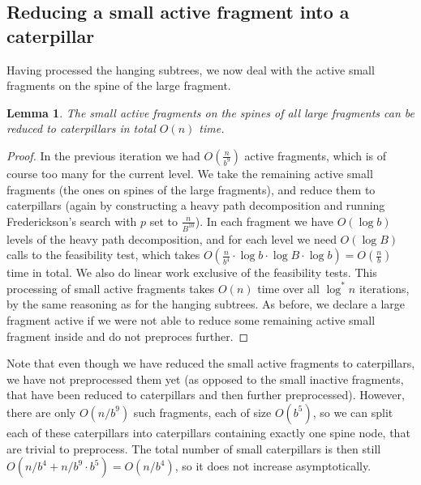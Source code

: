 \documentclass[11pt,a4paper]{article}
\newtheorem{lemma}{Lemma}
\theoremstyle{definition}
\theoremstyle{remark}
\begin{document}
\subsection{Reducing a small active fragment into a caterpillar}\label{section:lemma2}
Having processed the hanging subtrees, we now deal with the active small fragments on the spine of the large fragment. 

\begin{lemma}\label{lemma2}
	The small active fragments on the spines of all large fragments can be reduced to caterpillars in total $O(n)$ time. 
\end{lemma}
\begin{proof}

In the previous iteration we had $O(\frac{n}{b^9})$ active fragments, which is of course
too many for the current level. We take the remaining active small fragments (the ones on spines of the large 
fragments), and reduce them to caterpillars (again by constructing a heavy path decomposition and running
Frederickson's search with $p$ set to $\frac{n}{B^{10}}$). In each fragment we have $O(\log b)$ levels of the heavy
path decomposition, and for each level we need $O(\log B)$ calls to the feasibility test, which takes
$O(\frac{n}{b^4} \cdot \log b \cdot \log B \cdot \log b) = O(\frac{n}{b})$ time in total. We also do linear
work exclusive of the feasibility tests. This processing of small active fragments takes $O(n)$ time over all
$\log ^*n$ iterations, by the same reasoning as for the hanging subtrees.
As before, we declare a large fragment active if we were not able to reduce some remaining active small
fragment inside and do not preproces further.
\end{proof}

Note that even though we have reduced the small active fragments to caterpillars, we have not preprocessed them yet
(as opposed to the small inactive fragments, that have been reduced to caterpillars and then further preprocessed).
However, there are only $O(n/b^{9})$ such fragments, each of size $O(b^{5})$, so we can split each
of these caterpillars into caterpillars containing exactly one spine node, that are trivial to preprocess.
The total number of small caterpillars is then still $O(n/b^{4}+n/b^{9}\cdot b^{5})=O(n/b^{4})$,
so it does not increase asymptotically.

\end{document}
